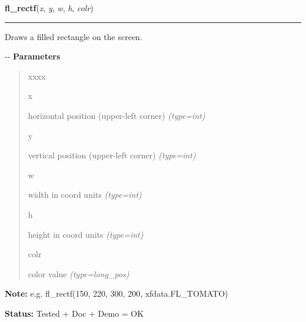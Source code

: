     \label{xformslib:flxbasic:fl_rectf}

    \vspace{0.5ex}

\hspace{.8\funcindent}\begin{boxedminipage}{\funcwidth}

    \raggedright \textbf{fl\_rectf}(\textit{x}, \textit{y}, \textit{w}, \textit{h}, \textit{colr})

    \vspace{-1.5ex}

    \rule{\textwidth}{0.5\fboxrule}
\setlength{\parskip}{2ex}

Draws a filled rectangle on the screen.

-{}-
\setlength{\parskip}{1ex}
      \textbf{Parameters}
      \vspace{-1ex}

      \begin{quote}
        \begin{Ventry}{xxxx}

          \item[x]


horizontal position (upper-left corner)
            {\it (type=int)}

          \item[y]


vertical position (upper-left corner)
            {\it (type=int)}

          \item[w]


width in coord units
            {\it (type=int)}

          \item[h]


height in coord units
            {\it (type=int)}

          \item[colr]


color value
            {\it (type=long\_pos)}

        \end{Ventry}

      \end{quote}

\textbf{Note:} 
e.g. fl\_rectf(150, 220, 300, 200, xfdata.FL\_TOMATO)


\textbf{Status:} 
Tested + Doc + Demo = OK


    \end{boxedminipage}

